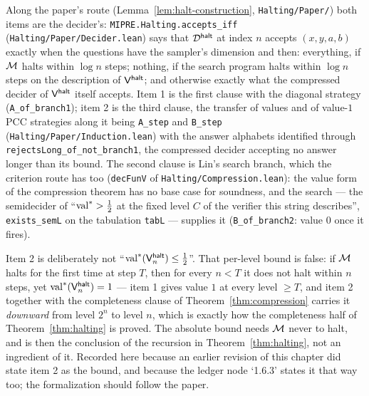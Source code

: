 Along the paper's route (Lemma~\ref{lem:halt-construction}, \texttt{Halting/Paper/}) both
items are the decider's: \texttt{MIPRE.Halting.accepts\_iff}
(\texttt{Halting/Paper/Decider.lean}) says that $\mathcal{D}^{\mathsf{halt}}$ at index $n$ accepts $(x, y, a, b)$
exactly when the questions have the sampler's dimension and then: everything, if $\mathcal{M}$
halts within $\log n$ steps; nothing, if the search program halts within $\log n$ steps on
the description of $\mathsf{V}^{\mathsf{halt}}$; and otherwise exactly what the compressed decider of $\mathsf{V}^{\mathsf{halt}}$
itself accepts. Item 1 is the first clause with the diagonal strategy
(\texttt{A\_of\_branch1}); item 2 is the third clause, the transfer of values and of
value-$1$ PCC strategies along it being \texttt{A\_step} and \texttt{B\_step}
(\texttt{Halting/Paper/Induction.lean}) with the answer alphabets identified through
\texttt{rejectsLong\_of\_not\_branch1}, the compressed decider accepting no answer longer
than its bound. The second clause is Lin's search branch, which the criterion route has too
(\texttt{decFunV} of \texttt{Halting/Compression.lean}): the value form of the compression
theorem has no base case for soundness, and the search --- the semidecider of
``$\mathrm{val}^* > \frac12$ at the fixed level $C$ of the verifier this string describes'',
\texttt{exists\_semL} on the tabulation \texttt{tabL} --- supplies it
(\texttt{B\_of\_branch2}: value $0$ once it fires).

\begin{remark}
\label{rem:dhalt-transfer}
Item 2 is deliberately not ``$\mathrm{val}^*(\mathsf{V}^{\mathsf{halt}}_n) \leq \frac12$''. That per-level bound is
false: if $\mathcal{M}$ halts for the first time at step $T$, then for every $n < T$ it does
not halt within $n$ steps, yet $\mathrm{val}^*(\mathsf{V}^{\mathsf{halt}}_n) = 1$ --- item 1 gives value $1$ at every
level $\geq T$, and item 2 together with the completeness clause of
Theorem~\ref{thm:compression} carries it \emph{downward} from level $2^n$ to level $n$,
which is exactly how the completeness half of Theorem~\ref{thm:halting} is proved. The
absolute bound needs $\mathcal{M}$ never to halt, and is then the conclusion of the recursion
in Theorem~\ref{thm:halting}, not an ingredient of it. Recorded here because an earlier
revision of this chapter did state item 2 as the bound, and because the ledger node
`1.6.3' states it that way too; the formalization should follow the paper.
\end{remark}

